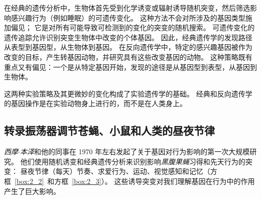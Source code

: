 在经典的遗传分析中，生物体首先受到化学诱变或辐射诱导随机突变，然后筛选影响感兴趣行为（例如睡眠）的可遗传变化。
这种方法不会对所涉及的基因类型施加偏见；
它是对所有可能导致可检测到的变化的突变的随机搜索。 
可遗传变化的遗传追踪允许识别突变生物体中改变的个体基因。
因此，经典遗传学的发现路径从表型到基因型，从生物体到基因。
在反向遗传学中，特定的感兴趣基因被作为改变的目标，产生转基因动物，并研究具有这些改变基因的动物。
这种策略既有重点又有偏见：一个是从特定基因开始，发现的途径是从基因型到表型，从基因到生物体。


这两种实验策略及其更微妙的变化构成了实验遗传学的基础。
经典和反向遗传学的基因操作是在实验动物身上进行的，而不是在人类身上。



\subsection{转录振荡器调节苍蝇、小鼠和人类的昼夜节律}

\textit{西摩$\cdot$本泽}和他的同事在 1970 年左右发起了关于基因对行为影响的第一次大规模研究。
他们使用随机诱变和经典遗传分析来识别影响\textit{黑腹果蝇}习得和先天行为的突变：
昼夜节律（每天）节奏、求爱行为、运动、视觉感知和记忆（方框~\ref{box:2_2}~和方框~\ref{box:2_3}）。
这些诱导突变对我们理解基因在行为中的作用产生了巨大影响。


